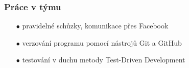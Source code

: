 \documentclass[10pt,xcolor=pdflatex]{beamer}
\begin{document}
\begin{frame}\frametitle{Práce v týmu}
    \begin{itemize}
	\item[$\bullet$] pravidelné schůzky, komunikace přes Facebook
	\item[$\bullet$] verzování programu pomocí nástrojů Git a GitHub
	\item[$\bullet$] testování v duchu metody Test-Driven Development
	\end{itemize}
\end{frame}

\end{document}

